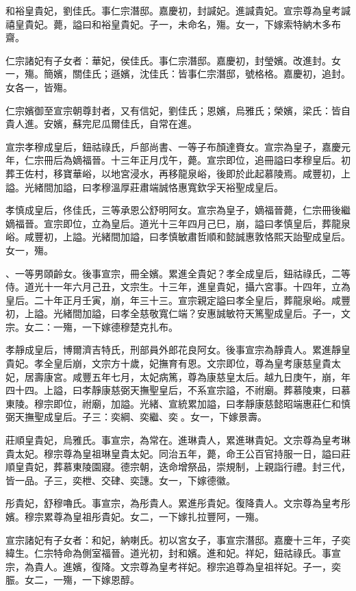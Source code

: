 \begin{pinyinscope}
和裕皇貴妃，劉佳氏。事仁宗潛邸。嘉慶初，封諴妃。進諴貴妃。宣宗尊為皇考諴禧皇貴妃。薨，謚曰和裕皇貴妃。子一，未命名，殤。女一，下嫁索特納木多布齋。

仁宗諸妃有子女者：華妃，侯佳氏。事仁宗潛邸。嘉慶初，封瑩嬪。改進封。女一，殤。簡嬪，關佳氏；遜嬪，沈佳氏：皆事仁宗潛邸，號格格。嘉慶初，追封。女各一，皆殤。

仁宗嬪御至宣宗朝尊封者，又有信妃，劉佳氏；恩嬪，烏雅氏；榮嬪，梁氏：皆自貴人進。安嬪，蘇完尼瓜爾佳氏，自常在進。

宣宗孝穆成皇后，鈕祜祿氏，戶部尚書、一等子布顏達賚女。宣宗為皇子，嘉慶元年，仁宗冊后為嫡福晉。十三年正月戊午，薨。宣宗即位，追冊謚曰孝穆皇后。初葬王佐村，移寶華峪，以地宮浸水，再移龍泉峪，後即於此起慕陵焉。咸豐初，上謚。光緒間加謚，曰孝穆溫厚莊肅端誠恪惠寬欽孚天裕聖成皇后。

孝慎成皇后，佟佳氏，三等承恩公舒明阿女。宣宗為皇子，嫡福晉薨，仁宗冊後繼嫡福晉。宣宗即位，立為皇后。道光十三年四月己巳，崩，謚曰孝慎皇后，葬龍泉峪。咸豐初，上謚。光緒間加謚，曰孝慎敏肅哲順和懿誠惠敦恪熙天詒聖成皇后。女一，殤。

、一等男頤齡女。後事宣宗，冊全嬪。累進全貴妃？孝全成皇后，鈕祜祿氏，二等侍。道光十一年六月己丑，文宗生。十三年，進皇貴妃，攝六宮事。十四年，立為皇后。二十年正月壬寅，崩，年三十三。宣宗親定謚曰孝全皇后，葬龍泉峪。咸豐初，上謚。光緒間加謚，曰孝全慈敬寬仁端？安惠誠敏符天篤聖成皇后。子一，文宗。女二：一殤，一下嫁德穆楚克扎布。

孝靜成皇后，博爾濟吉特氏，刑部員外郎花良阿女。後事宣宗為靜貴人。累進靜皇貴妃。孝全皇后崩，文宗方十歲，妃撫育有恩。文宗即位，尊為皇考康慈皇貴太妃，居壽康宮。咸豐五年七月，太妃病篤，尊為康慈皇太后。越九日庚午，崩，年四十四。上謚，曰孝靜康慈弼天撫聖皇后，不系宣宗謚，不祔廟。葬慕陵東，曰慕東陵。穆宗即位，祔廟，加謚。光緒、宣統累加謚，曰孝靜康慈懿昭端惠莊仁和慎弼天撫聖成皇后。子三：奕綱、奕繼、奕。女一，下嫁景壽。

莊順皇貴妃，烏雅氏。事宣宗，為常在。進琳貴人，累進琳貴妃。文宗尊為皇考琳貴太妃。穆宗尊為皇祖琳皇貴太妃。同治五年，薨，命王公百官持服一日，謚曰莊順皇貴妃，葬慕東陵園寢。德宗朝，迭命增祭品，崇規制，上親詣行禮。封三代，皆一品。子三，奕枻、交硉、奕譓。女一，下嫁德徽。

彤貴妃，舒穆嚕氏。事宣宗，為彤貴人。累進彤貴妃。復降貴人。文宗尊為皇考彤嬪。穆宗累尊為皇祖彤貴妃。女二，一下嫁扎拉豐阿，一殤。

宣宗諸妃有子女者：和妃，納喇氏。初以宮女子，事宣宗潛邸。嘉慶十三年，子奕緯生。仁宗特命為側室福晉。道光初，封和嬪。進和妃。祥妃，鈕祜祿氏。事宣宗，為貴人。進嬪，復降。文宗尊為皇考祥妃。穆宗追尊為皇祖祥妃。子一，奕脤。女二，一殤，一下嫁恩醇。


\end{pinyinscope}
